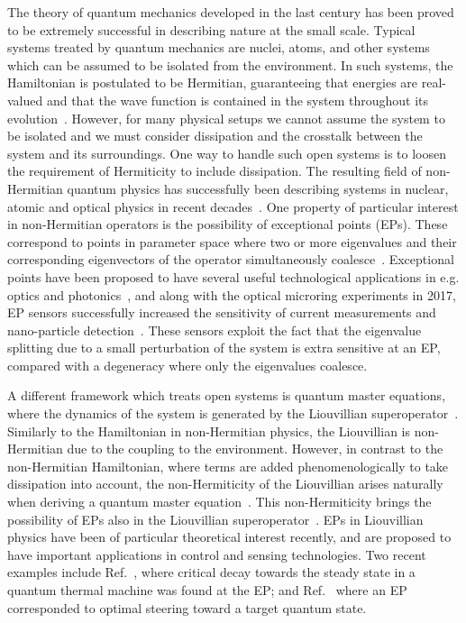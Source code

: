 \documentclass[../main.tex]{subfiles}
\begin{document}
The theory of quantum mechanics developed in the last century has been proved to be extremely successful in describing nature at the small scale. Typical systems treated by quantum mechanics are nuclei, atoms, and other systems which can be assumed to be isolated from the environment. In such systems, the Hamiltonian is postulated to be Hermitian, guaranteeing that energies are real-valued and that the wave function is contained in the system throughout its evolution~\cite{sakurai}. However, for many physical setups we cannot assume the system to be isolated and we must consider dissipation and the crosstalk between the system and its surroundings. One way to handle such open systems is to loosen the requirement of Hermiticity to include dissipation. The resulting field of non-Hermitian quantum physics has successfully been describing systems in nuclear, atomic and optical physics in recent decades~\cite{nonHermrev}. One property of particular interest in non-Hermitian operators is the possibility of exceptional points (EPs). These correspond to points in parameter space where two or more eigenvalues and their corresponding eigenvectors of the operator simultaneously coalesce~\cite{ep_expl}. Exceptional points have been proposed to have several useful technological applications in e.g. optics and photonics~\cite{eptechrev1,eptechrev2}, and along with the optical microring experiments in 2017, EP sensors successfully increased the sensitivity of current measurements and nano-particle detection~\cite{microring1, microring2}. These sensors exploit the fact that the eigenvalue splitting due to a small perturbation of the system is extra sensitive at an EP, compared with a degeneracy where only the eigenvalues coalesce.

A different framework which treats open systems is quantum master equations, where the dynamics of the system is generated by the Liouvillian superoperator~\cite{bookopen}. Similarly to the Hamiltonian in non-Hermitian physics, the Liouvillian is non-Hermitian due to the coupling to the environment. However, in contrast to the non-Hermitian Hamiltonian, where terms are added phenomenologically to take dissipation into account, the non-Hermiticity of the Liouvillian arises naturally when deriving a quantum master equation~\cite{compLvsnonH}. This non-Hermiticity brings the possibility of EPs also in the Liouvillian superoperator~\cite{HEPvsLEP}. EPs in Liouvillian physics have been of particular theoretical interest recently, and are proposed to have important applications in control and sensing technologies. Two recent examples include Ref.~\cite{thermal}, where critical decay towards the steady state in a quantum thermal machine was found at the EP; and Ref.~\cite{steering} where an EP corresponded to optimal steering toward a target quantum state.
\end{document}
